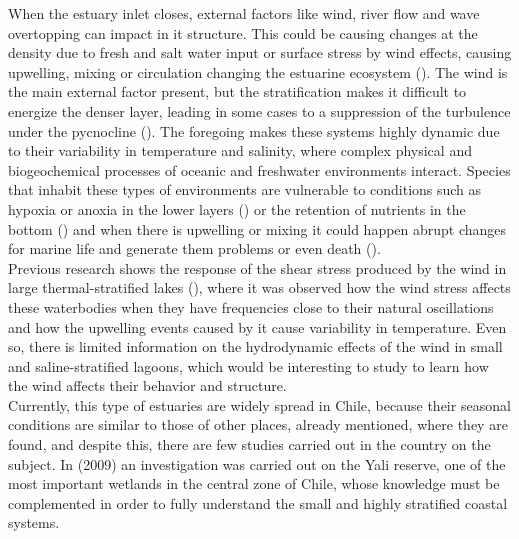 \documentclass[11pt,letterpaper]{article}
\begin{document}
When the estuary inlet closes, external factors like wind, river flow and wave overtopping can impact in it structure. This could be causing changes at the density due to fresh and salt water input or surface stress by wind effects, causing upwelling, mixing or circulation changing the estuarine ecosystem (\cite{Ranasinghe1999}).  The wind is the main external factor present, but the stratification makes it difficult to energize the denser layer, leading in some cases to a suppression of the turbulence under the pycnocline (\cite{Cousins2010}). The foregoing makes these systems highly dynamic due to their variability in temperature and salinity, where complex physical and biogeochemical processes of oceanic and freshwater environments interact. Species that inhabit these types of environments are vulnerable to conditions such as hypoxia or anoxia in the lower layers (\cite{Kelly2018}) or the retention of nutrients in the bottom (\cite{Cousins2010}) and when there is upwelling or mixing it could happen abrupt changes for marine life and generate them problems or even death (\cite{marti2008relating}).\\

Previous research shows the response of the shear stress produced by the wind in large thermal-stratified lakes (\cite{Coman2012, Laval2008, avalos2019natural}), where it was observed how the wind stress affects these waterbodies when they have frequencies close to their natural oscillations and how the upwelling events caused by it cause variability in temperature. Even so, there is limited information on the hydrodynamic effects of the wind in small and saline-stratified lagoons, which would be interesting to study to learn how the wind affects their behavior and structure.\\

Currently, this type of estuaries are widely spread in Chile, because their seasonal conditions are similar to those of other places, already mentioned, where they are found, and despite this, there are few studies carried out in the country on the subject. In \citeauthor{dussaillant2009} (2009) an investigation was carried out on the Yali reserve, one of the most important wetlands in the central zone of Chile, whose knowledge must be complemented in order to fully understand the small and highly stratified coastal systems.\\

\end{document}
